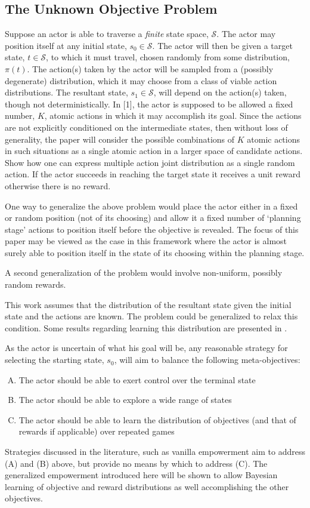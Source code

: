 \documentclass{article}
\newcommand{\Ss}{\mathcal{S}}
\begin{document}
\subsection{The Unknown Objective Problem}
Suppose an actor is able to traverse a \textit{finite} state space, $\Ss$. 
The actor may position itself at any initial state, $s_0\in \Ss$. 
The actor will then be given a target state, $t\in \Ss$, to which it must travel, chosen randomly from some distribution, $\pi(t)$. 
The action(s) taken by the actor will be sampled from a (possibly degenerate) distribution, which it may choose from a class of viable action distributions. 
The resultant state, $s_1\in\Ss$, will depend on the action(s) taken, though not deterministically.  
In [1], the actor is supposed to be allowed a fixed number, $K$, atomic actions in which it may accomplish its goal. 
Since the actions are not explicitly conditioned on the intermediate states, then without loss of generality, the paper will consider the possible combinations of $K$ atomic actions in such situations as a single atomic action in a larger space of candidate actions. \color{red} Show how one can express multiple action joint distribution as a single random action. \color{black}
If the actor succeeds in reaching the target state it receives a unit reward otherwise there is no reward.

One way to generalize the above problem would place the actor either in a fixed or random position (not of its choosing) and allow it a fixed number of `planning stage' actions to position itself before the objective is revealed. 
The focus of this paper may be viewed as the case in this framework where the actor is almost surely able to position itself in the state of its choosing within the planning stage.

A second generalization of the problem would involve non-uniform, possibly random rewards. 

This work assumes that the distribution of the resultant state given the initial state and the actions are known. The problem could be generalized to relax this condition. Some results regarding learning this distribution are presented in \cite{depeweg2016learning}.

As the actor is uncertain of what his goal will be, any reasonable strategy for selecting the starting state, $s_0$, will aim to balance the following meta-objectives:
\begin{enumerate}[(A)]
\item The actor should be able to exert control over the terminal state
\item The actor should be able to explore a wide range of states 
\item The actor should be able to learn the distribution of objectives (and that of rewards if applicable) over repeated games 
\end{enumerate}
Strategies discussed in the literature, such as vanilla empowerment \cite{mohamed2015variational, salge2014empowerment, chentanez2004intrinsically} aim to address (A) and (B) above, but provide no means by which to address (C). 
The generalized empowerment introduced here will be shown to allow Bayesian learning of objective and reward distributions as well accomplishing the other objectives.
\end{document}

